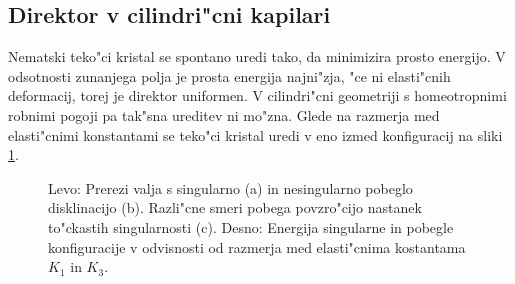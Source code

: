 \documentclass[a4paper,10pt]{article}
\begin{document}
\subsection{Direktor v cilindri"cni kapilari}

Nematski teko"ci kristal se spontano uredi tako, da minimizira prosto energijo. 
V odsotnosti zunanjega polja je prosta energija najni"zja, "ce ni elasti"cnih deformacij, torej je direktor uniformen. 
V cilindri"cni geometriji s homeotropnimi robnimi pogoji pa tak"sna ureditev ni mo"zna. 
Glede na razmerja med elasti"cnimi konstantami se teko"ci kristal uredi v eno izmed konfiguracij na sliki \ref{fig:director-profiles}. 

\begin{figure}[h]
\centering
{}
\caption{Levo: Prerezi valja s singularno (a) in nesingularno pobeglo disklinacijo (b). 
Razli"cne smeri pobega povzro"cijo nastanek to"ckastih singularnosti (c). Desno: Energija singularne in pobegle konfiguracije v odvisnosti od razmerja med elasti"cnima kostantama $K_1$ in $K_3$\cite{kleman}. }
 \label{fig:director-profiles}
\end{figure}
\end{document}
